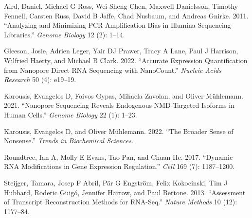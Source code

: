 \documentclass[
  letterpaper,
  DIV=11,
  numbers=noendperiod]{scrartcl}
\newlength{\cslhangindent}
\newlength{\cslentryspacingunit} %
\newenvironment{CSLReferences}[2] %
 {%
  \setlength{\parindent}{0pt}
  \ifodd #1
  \let\oldpar\par
  \def\par{\hangindent=\cslhangindent\oldpar}
  \fi
  \setlength{\parskip}{#2\cslentryspacingunit}
 }%
 {}
\begin{document}
\hypertarget{refs}{}
\begin{CSLReferences}{1}{0}
\leavevmode{}%
Aird, Daniel, Michael G Ross, Wei-Sheng Chen, Maxwell Danielsson,
Timothy Fennell, Carsten Russ, David B Jaffe, Chad Nusbaum, and Andreas
Gnirke. 2011. {``Analyzing and Minimizing PCR Amplification Bias in
Illumina Sequencing Libraries.''} \emph{Genome Biology} 12 (2): 1--14.

\leavevmode{}%
Gleeson, Josie, Adrien Leger, Yair DJ Prawer, Tracy A Lane, Paul J
Harrison, Wilfried Haerty, and Michael B Clark. 2022. {``Accurate
Expression Quantification from Nanopore Direct RNA Sequencing with
NanoCount.''} \emph{Nucleic Acids Research} 50 (4): e19--19.

\leavevmode{}%
Karousis, Evangelos D, Foivos Gypas, Mihaela Zavolan, and Oliver
Mühlemann. 2021. {``Nanopore Sequencing Reveals Endogenous NMD-Targeted
Isoforms in Human Cells.''} \emph{Genome Biology} 22 (1): 1--23.

\leavevmode{}%
Karousis, Evangelos D, and Oliver Mühlemann. 2022. {``The Broader Sense
of Nonsense.''} \emph{Trends in Biochemical Sciences}.

\leavevmode{}%
Roundtree, Ian A, Molly E Evans, Tao Pan, and Chuan He. 2017. {``Dynamic
RNA Modifications in Gene Expression Regulation.''} \emph{Cell} 169 (7):
1187--1200.

\leavevmode{}%
Steijger, Tamara, Josep F Abril, Pär G Engström, Felix Kokocinski, Tim J
Hubbard, Roderic Guigó, Jennifer Harrow, and Paul Bertone. 2013.
{``Assessment of Transcript Reconstruction Methods for RNA-Seq.''}
\emph{Nature Methods} 10 (12): 1177--84.

\end{CSLReferences}
\end{document}
